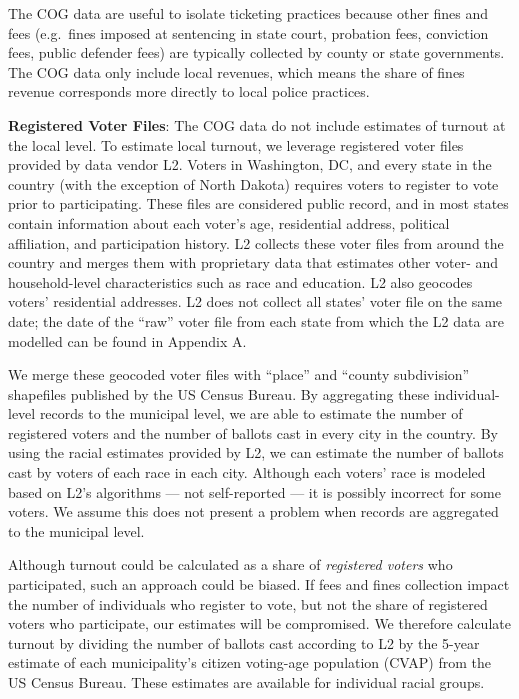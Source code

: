 \documentclass[
  12pt,
]{article}
\begin{document}
The COG data are useful to isolate ticketing practices because other fines and fees (e.g.~fines imposed at sentencing in state court, probation fees, conviction fees, public defender fees) are typically collected by county or state governments. The COG data only include local revenues, which means the share of fines revenue corresponds more directly to local police practices.

\textbf{Registered Voter Files}: The COG data do not include estimates of turnout at the local level. To estimate local turnout, we leverage registered voter files provided by data vendor L2. Voters in Washington, DC, and every state in the country (with the exception of North Dakota) requires voters to register to vote prior to participating. These files are considered public record, and in most states contain information about each voter's age, residential address, political affiliation, and participation history. L2 collects these voter files from around the country and merges them with proprietary data that estimates other voter- and household-level characteristics such as race and education. L2 also geocodes voters' residential addresses. L2 does not collect all states' voter file on the same date; the date of the ``raw'' voter file from each state from which the L2 data are modelled can be found in Appendix A.

We merge these geocoded voter files with ``place'' and ``county subdivision'' shapefiles published by the US Census Bureau. By aggregating these individual-level records to the municipal level, we are able to estimate the number of registered voters and the number of ballots cast in every city in the country. By using the racial estimates provided by L2, we can estimate the number of ballots cast by voters of each race in each city. Although each voters' race is modeled based on L2's algorithms --- not self-reported --- it is possibly incorrect for some voters. We assume this does not present a problem when records are aggregated to the municipal level.

Although turnout could be calculated as a share of \emph{registered voters} who participated, such an approach could be biased. If fees and fines collection impact the number of individuals who register to vote, but not the share of registered voters who participate, our estimates will be compromised. We therefore calculate turnout by dividing the number of ballots cast according to L2 by the 5-year estimate of each municipality's citizen voting-age population (CVAP) from the US Census Bureau. These estimates are available for individual racial groups.
\end{document}
